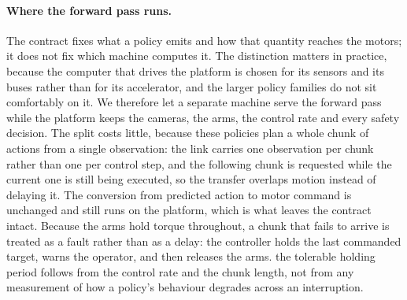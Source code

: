 \paragraph{Where the forward pass runs.} The contract fixes what a policy emits
and how that quantity reaches the motors; it does not fix which machine computes
it. The distinction matters in practice, because the computer that drives the
platform is chosen for its sensors and its buses rather than for its
accelerator, and the larger policy families do not sit comfortably on it. We
therefore let a separate machine serve the forward pass while the platform keeps
the cameras, the arms, the control rate and every safety decision. The split
costs little, because these policies plan a whole chunk of actions from a single
observation: the link carries one observation per chunk rather than one per
control step, and the following chunk is requested while the current one is
still being executed, so the transfer overlaps motion instead of delaying it.
The conversion from predicted action to motor command is unchanged and still
runs on the platform, which is what leaves the contract intact. Because the arms
hold torque throughout, a chunk that fails to arrive is treated as a fault
rather than as a delay: the controller holds the last commanded target, warns
the operator, and then releases the arms. \unjustified{} the tolerable holding
period follows from the control rate and the chunk length, not from any
measurement of how a policy's behaviour degrades across an interruption.

